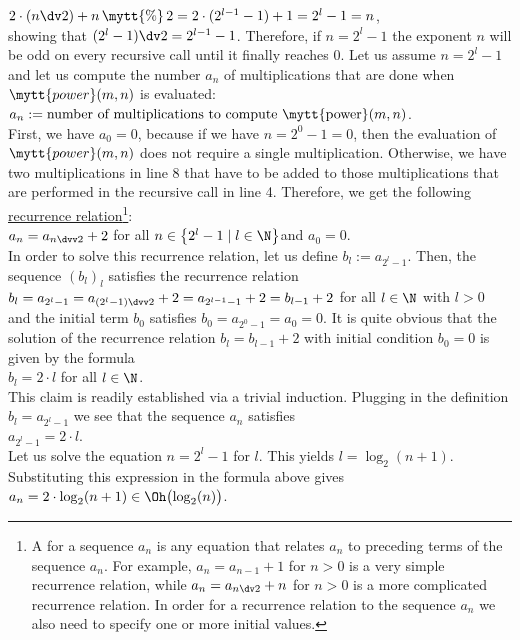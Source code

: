 $2 \cdot(n \dv 2) + n \,\mytt{\symbol{37}}\, 2 = 2 \cdot (2^{l-1} - 1) + 1 = 2^l - 1 = n$,
\\[0.2cm]
showing that $(2^l -1 ) \dv 2 = 2^{l-1} -1$.
Therefore, if $n = 2^l - 1$ the exponent $n$ will be odd on every recursive call until it finally reaches $0$.
Let us assume $n = 2^l - 1$ and let us compute the number $a_n$ of multiplications that
are done when $\mytt{power}(m,n)$ is evaluated:
\\[0.2cm]
\hspace*{1.3cm}
$a_n := \mbox{number of multiplications to compute \mytt{power}}(m, n)$.
\\[0.2cm]
First, we have $a_0 = 0$, because if we have $n = 2^0 - 1 = 0$, then the evaluation of 
$\mytt{power}(m, n)$ does not require a single multiplication.
Otherwise, we have two multiplications in line 8 that have to be added to those multiplications
that are performed in the recursive call in line 4.  Therefore, we get the following
\href{http://en.wikipedia.org/wiki/Recurrence_relation}{recurrence relation}\footnote{
  A   for a sequence $a_n$ is any equation that relates
  $a_n$ to preceding terms of the sequence $a_n$.  For example, $a_n = a_{n-1} + 1$ for $n > 0$ is a very
  simple recurrence relation, while $a_n = a_{n \dv 2} + n$ for $n > 0$ is a more complicated recurrence
  relation.  In order for a recurrence relation to  the sequence $a_n$ we also need to specify one
  or more initial values.  
}:
\\[0.2cm]
\hspace*{1.3cm}
$a_n = a_{n \dvv 2} + 2$ \qquad for all $n \in \left\{2^l - 1 \mid l \in \N\right\}$\quad and $a_0 = 0$. 
\\[0.2cm]
In order to solve this recurrence relation, let us define $b_l := a_{2^l-1}$.  Then, the sequence
$(b_l)_l$ 
satisfies the recurrence relation
 \\[0.2cm]
\hspace*{1.3cm} 
$b_l = a_{2^l-1} = a_{(2^l-1) \dvv 2} + 2 = a_{2^{l-1}-1} + 2 = b_{l-1} +2$ \qquad for all $l\in\N$ with
$l > 0$
\\[0.2cm]
and the initial term $b_0$ satisfies $b_0 = a_{2^0-1} = a_0 = 0$.  It is quite obvious that the
solution of the recurrence relation $b_l = b_{l-1} + 2$ with initial condition $b_0 = 0$ is given by the formula
\\[0.2cm]
\hspace*{1.3cm} $b_l = 2 \cdot l$ \qquad for all $l \in \N$. 
\\[0.2cm] 
This claim is readily established via a trivial induction.  Plugging in the definition $b_l = a_{2^l-1}$ we
see that the sequence $a_n$ satisfies \\[0.2cm]
\hspace*{1.3cm} $a_{2^l-1} = 2 \cdot l$. 
\\[0.2cm]
Let us solve the equation $n = 2^l - 1$ for $l$.  This yields
 $l =
\log_2(n+1)$.  Substituting this expression in the formula above gives \\[0.2cm]
\hspace*{1.3cm} $a_n = 2 \cdot \log_2(n+1) \in \Oh\bigl(\log_2(n)\bigr)$.
\vspace*{0.3cm}

